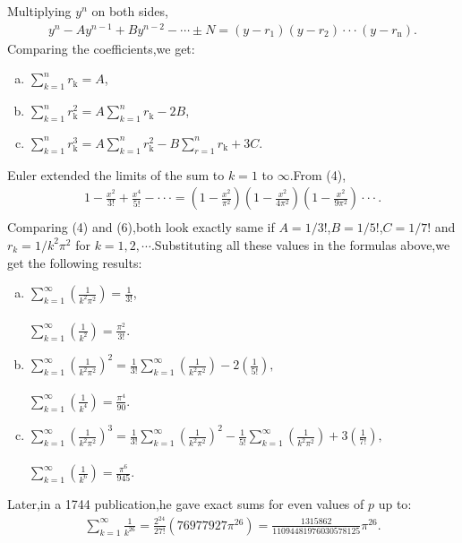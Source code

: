 \documentclass[a4paper,reqno,11pt]{book}
\theoremstyle{plain}%
\theoremstyle{definition}
\begin{document}
Multiplying $y^n$ on both sides,
\begin{eqnarray*}
    y^n-Ay^{n-1}+By^{n-2}-\cdots\pm N=(y-r_{\text{1}})(y-r_{\text{2}})\cdot\cdot\cdot(y-r_{\text{n}}).
\end{eqnarray*}
Comparing the coefficients,we get:
\begin{enumerate}[(a)]
     \item $\sum_{k=1}^{n}r_{\text{k}}=A$,\\
     \item  $\sum_{k=1}^{n}r_{\text{k}}^2=A\sum_{k=1}^{n}r_{\text{k}}-2B$,\\
     \item $\sum_{k=1}^{n}r_{\text{k}}^3=A\sum_{k=1}^{n}r_{\text{k}}^2-B\sum_{r=1}^{n}r_{\text{k}}+3C$.\\
\end{enumerate}
Euler extended the limits of the sum to $k=1$ to $\infty$.From (4),
\begin{eqnarray*}
     1-\frac{x^2}{3!}+\frac{x^4}{5!}-\cdot\cdot\cdot=\left(1-\frac{x^2}{\pi^2}\right)\left(1-\frac{x^2}{4\pi^2}\right)\left(1-\frac{x^2}{9\pi^2}\right)\cdot\cdot\cdot.\\
\end{eqnarray*}
Comparing (4) and (6),both look exactly same if $A=1/3!$,$B=1/5!$,$C=1/7!$ and $r_{k}=1/k^2\pi^2$ for $k=1,2,\cdots$.Substituting all these values in the formulas above,we get the following results:
\begin{enumerate}[(a)]
    \item $\sum_{k=1}^{\infty}\left(\frac{1}{k^2\pi^2}\right)=\frac{1}{3!}$,\\
    \\
        $\sum_{k=1}^{\infty}\left(\frac{1}{k^2}\right)=\frac{\pi^2}{3!}$.
    \item $\sum_{k=1}^{\infty}\left(\frac{1}{k^2\pi^2}\right)^2=\frac{1}{3!}\sum_{k=1}^{\infty}\left(\frac{1}{k^2\pi^2}\right)-2\left(\frac{1}{5!}\right),$\\
    \\
    $\sum_{k=1}^{\infty}\left(\frac{1}{k^4}\right)=\frac{\pi^4}{90}.$
    \item $\sum_{k=1}^{\infty}\left(\frac{1}{k^2\pi^2}\right)^3=\frac{1}{3!}\sum_{k=1}^{\infty}\left(\frac{1}{k^2\pi^2}\right)^2-\frac{1}{5!}\sum_{k=1}^{\infty}\left(\frac{1}{k^2\pi^2}\right)+3\left(\frac{1}{7!}\right),$\\
    \\
    $\sum_{k=1}^{\infty}\left(\frac{1}{k^6}\right)=\frac{\pi^6}{945}.$
\end{enumerate}
Later,in a 1744 publication,he gave exact sums for even values of $p$ up to\cite{ref10}:
\begin{eqnarray*}
    \sum_{k=1}^{\infty}\frac{1}{k^{26}}=\frac{2^{24}}{27!}(76977927\pi^{26})=\frac{1315862}{11094481976030578125}\pi^{26}.
\end{eqnarray*}
\end{document}
